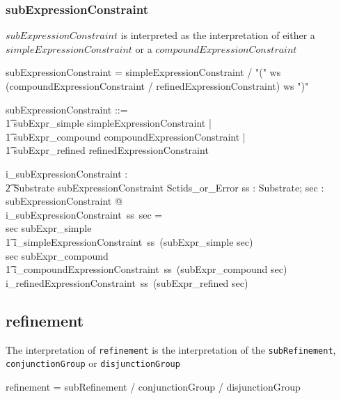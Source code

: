 \documentclass{article}
\def\spec#1{{\tt #1}}
\def\bnf#1{{\scriptsize {{#1}} }}
\begin{document}
\subsubsection{subExpressionConstraint}
$subExpressionConstraint$ is interpreted as the interpretation of either a $simpleExpressionConstraint$
or a $compoundExpressionConstraint$
\begin{framed}
\noindent
\bnf{subExpressionConstraint = simpleExpressionConstraint / "(" ws (compoundExpressionConstraint / refinedExpressionConstraint)  ws ")"}
\end{framed}

\begin{zed}
subExpressionConstraint ::= \\
\t1 subExpr\_simple \ldata simpleExpressionConstraint \rdata | \\
\t1 subExpr\_compound \ldata compoundExpressionConstraint \rdata | \\
\t1 subExpr\_refined \ldata refinedExpressionConstraint \rdata
\end{zed}

\begin{gendef}
   i\_subExpressionConstraint : \\
\t2 Substrate \fun subExpressionConstraint \fun Sctids\_or\_Error
\where
   \forall ss : Substrate; sec : subExpressionConstraint @ \\
i\_subExpressionConstraint~ss~sec = \\
   \IF sec \in \ran subExpr\_simple \\
\t1 \THEN i\_simpleExpressionConstraint~ss~(subExpr\_simple \inv sec) \\
    \ELSE \IF sec \in \ran subExpr\_compound \\
\t1 \THEN i\_compoundExpressionConstraint~ss~(subExpr\_compound \inv sec) \\
    \ELSE i\_refinedExpressionConstraint~ss~(subExpr\_refined \inv sec) 
\end{gendef}

\subsection{refinement}
The interpretation of \spec{refinement} is the interpretation of the \spec{subRefinement}, \spec{conjunctionGroup} or \spec{disjunctionGroup}
\begin{framed}
\noindent
\bnf{refinement = subRefinement / conjunctionGroup / disjunctionGroup}
\end{framed}
\end{document}
